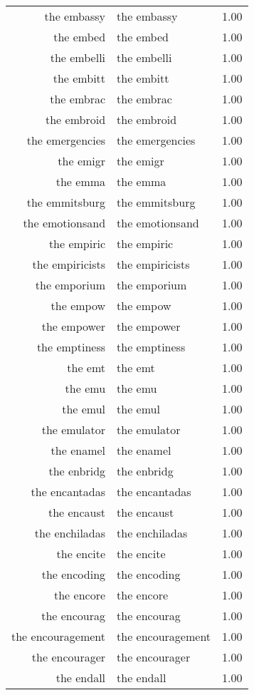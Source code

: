 \begin{table}[ht]
\begin{tabular}{rlr}
  the embassy & the embassy & 1.00 \\ 
  the embed & the embed & 1.00 \\ 
  the embelli & the embelli & 1.00 \\ 
  the embitt & the embitt & 1.00 \\ 
  the embrac & the embrac & 1.00 \\ 
  the embroid & the embroid & 1.00 \\ 
  the emergencies & the emergencies & 1.00 \\ 
  the emigr & the emigr & 1.00 \\ 
  the emma & the emma & 1.00 \\ 
  the emmitsburg & the emmitsburg & 1.00 \\ 
  the emotionsand & the emotionsand & 1.00 \\ 
  the empiric & the empiric & 1.00 \\ 
  the empiricists & the empiricists & 1.00 \\ 
  the emporium & the emporium & 1.00 \\ 
  the empow & the empow & 1.00 \\ 
  the empower & the empower & 1.00 \\ 
  the emptiness & the emptiness & 1.00 \\ 
  the emt & the emt & 1.00 \\ 
  the emu & the emu & 1.00 \\ 
  the emul & the emul & 1.00 \\ 
  the emulator & the emulator & 1.00 \\ 
  the enamel & the enamel & 1.00 \\ 
  the enbridg & the enbridg & 1.00 \\ 
  the encantadas & the encantadas & 1.00 \\ 
  the encaust & the encaust & 1.00 \\ 
  the enchiladas & the enchiladas & 1.00 \\ 
  the encite & the encite & 1.00 \\ 
  the encoding & the encoding & 1.00 \\ 
  the encore & the encore & 1.00 \\ 
  the encourag & the encourag & 1.00 \\ 
  the encouragement & the encouragement & 1.00 \\ 
  the encourager & the encourager & 1.00 \\ 
  the endall & the endall & 1.00 \\ 

\end{tabular}
\end{table}
